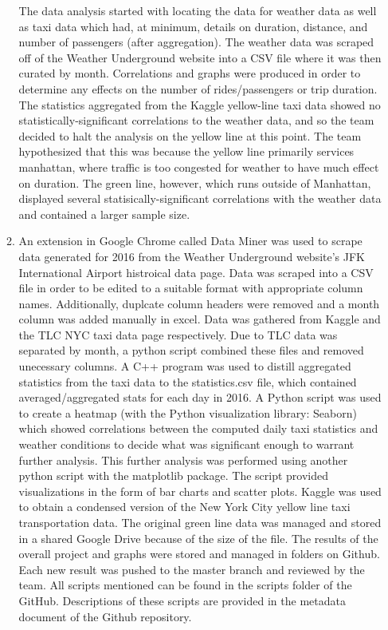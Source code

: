 \documentclass{article}
\begin{document}
\begin{enumerate}
\begin{enumerate}
        The data analysis started with locating the data for weather data as well as taxi data which had, at minimum, details on duration, distance, and number of passengers (after aggregation). The weather data was scraped off of the Weather Underground website into a CSV file where it was then curated by month. Correlations and graphs were produced in order to determine any effects on the number of rides/passengers or trip duration. The statistics aggregated from the Kaggle yellow-line taxi data showed no statistically-significant correlations to the weather data, and so the team decided to halt the analysis on the yellow line at this point. The team hypothesized that this was because the yellow line primarily services manhattan, where traffic is too congested for weather to have much effect on duration. The green line, however, which runs outside of Manhattan, displayed several statisically-significant correlations with the weather data and contained a larger sample size.


        \item %

        An extension in Google Chrome called Data Miner was used to scrape data generated for 2016 from the Weather Underground website's JFK International Airport histroical data page. Data was scraped into a CSV file in order to be edited to a suitable format with appropriate column names. Additionally, duplcate column headers were removed and a month column was added manually in excel. Data was gathered from Kaggle and the TLC NYC taxi data page respectively. Due to TLC data was separated by month, a python script combined these files and removed unecessary columns. A C++ program was used to distill aggregated statistics from the taxi data to the statistics.csv file, which contained averaged/aggregated stats for each day in 2016. A Python script was used to create a heatmap (with the Python visualization library: Seaborn) which showed correlations between the computed daily taxi statistics and weather conditions to decide what was significant enough to warrant further analysis. This further analysis was performed using another python script with the matplotlib package. The script provided visualizations in the form of bar charts and scatter plots.
		Kaggle was used to obtain a condensed version of the New York City yellow line taxi transportation data. The original green line data was managed and stored in a shared Google Drive because of the size of the file. The results of the overall project and graphs were stored and managed in folders on Github. Each new result was pushed to the master branch and reviewed by the team. All scripts mentioned can be found in the scripts folder of the GitHub. Descriptions of these scripts are provided in the metadata document of the Github repository.



\end{enumerate}
\end{enumerate}
\end{document}
